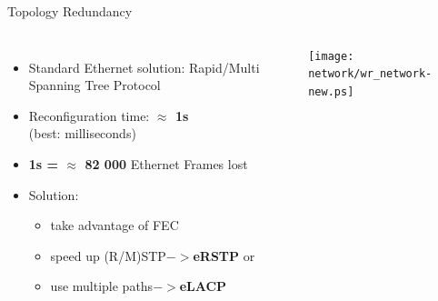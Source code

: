 \documentclass[compress,red]{beamer}
\begin{document}
\begin{frame}{Topology Redundancy}

\begin{columns}[c]

      \begin{itemize}
	    \item Standard Ethernet solution: Rapid/Multi Spanning Tree Protocol
	    \item Reconfiguration time: \textbf{$\approx$ 1s} \\ (best: milliseconds)
	    \item \textbf{1s = $\approx$ 82 000} Ethernet Frames lost
	    \item Solution:
	    \begin{itemize}
		  \item take advantage of FEC
		  \item speed up (R/M)STP$->$\textbf{eRSTP} or
		  \item use multiple paths$->$\textbf{eLACP}
	    \end{itemize}

      \end{itemize}
% 
    \begin{center}
    \texttt{[image: network/wr\_network-new.ps]}
    \end{center}
\end{columns}

\end{frame}
\end{document}
